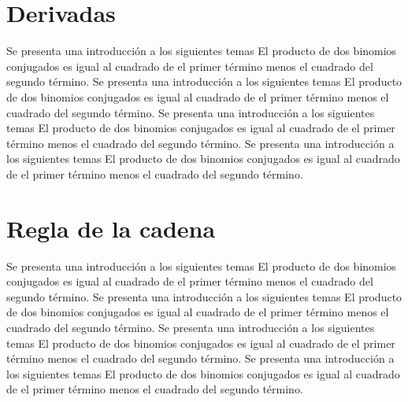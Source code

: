 \section{Derivadas}
Se presenta una introducción a los siguientes temas El producto de dos binomios conjugados es igual al cuadrado de el primer término menos el cuadrado del segundo término.
Se presenta una introducción a los siguientes temas El producto de dos binomios conjugados es igual al cuadrado de el primer término menos el cuadrado del segundo término.
Se presenta una introducción a los siguientes temas El producto de dos binomios conjugados es igual al cuadrado de el primer término menos el cuadrado del segundo término.
Se presenta una introducción a los siguientes temas El producto de dos binomios conjugados es igual al cuadrado de el primer término menos el cuadrado del segundo término.

\section{Regla de la cadena}
Se presenta una introducción a los siguientes temas El producto de dos binomios conjugados es igual al cuadrado de el primer término menos el cuadrado del segundo término.
Se presenta una introducción a los siguientes temas El producto de dos binomios conjugados es igual al cuadrado de el primer término menos el cuadrado del segundo término.
Se presenta una introducción a los siguientes temas El producto de dos binomios conjugados es igual al cuadrado de el primer término menos el cuadrado del segundo término.
Se presenta una introducción a los siguientes temas El producto de dos binomios conjugados es igual al cuadrado de el primer término menos el cuadrado del segundo término.
